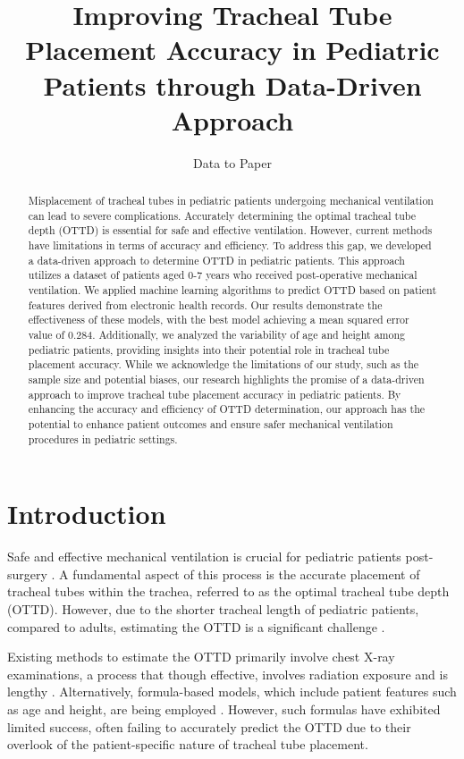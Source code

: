 \documentclass[11pt]{article}
\title{Improving Tracheal Tube Placement Accuracy in Pediatric Patients through Data-Driven Approach}
\author{Data to Paper}
\begin{document}
\maketitle
\begin{abstract}
Misplacement of tracheal tubes in pediatric patients undergoing mechanical ventilation can lead to severe complications. Accurately determining the optimal tracheal tube depth (OTTD) is essential for safe and effective ventilation. However, current methods have limitations in terms of accuracy and efficiency. To address this gap, we developed a data-driven approach to determine OTTD in pediatric patients. This approach utilizes a dataset of patients aged 0-7 years who received post-operative mechanical ventilation. We applied machine learning algorithms to predict OTTD based on patient features derived from electronic health records. Our results demonstrate the effectiveness of these models, with the best model achieving a mean squared error value of 0.284. Additionally, we analyzed the variability of age and height among pediatric patients, providing insights into their potential role in tracheal tube placement accuracy. While we acknowledge the limitations of our study, such as the sample size and potential biases, our research highlights the promise of a data-driven approach to improve tracheal tube placement accuracy in pediatric patients. By enhancing the accuracy and efficiency of OTTD determination, our approach has the potential to enhance patient outcomes and ensure safer mechanical ventilation procedures in pediatric settings.
\end{abstract}
\section*{Introduction}

Safe and effective mechanical ventilation is crucial for pediatric patients post-surgery \cite{Tsoulfanidis1983MeasurementAD, Bernstein1998IsBT}. A fundamental aspect of this process is the accurate placement of tracheal tubes within the trachea, referred to as the optimal tracheal tube depth (OTTD). However, due to the shorter tracheal length of pediatric patients, compared to adults, estimating the OTTD is a significant challenge \cite{Sampaio2015TheIO,Gupta2016RiskFF}.

Existing methods to estimate the OTTD primarily involve chest X-ray examinations, a process that though effective, involves radiation exposure and is lengthy \cite{Tsoulfanidis1983MeasurementAD}. Alternatively, formula-based models, which include patient features such as age and height, are being employed \cite{Tareerath2021AccuracyOA}. However, such formulas have exhibited limited success, often failing to accurately predict the OTTD due to their overlook of the patient-specific nature of tracheal tube placement.
\end{document}
